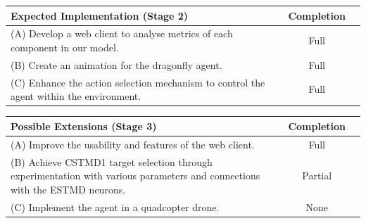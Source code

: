 \documentclass[a4paper,11pt]{article}
\begin{document}
\begin{center}
    \begin{tabular}{p{12cm} c c}
    \textbf{Expected Implementation (Stage 2)} & \textbf{Completion} \\ \hline
	(A) Develop a web client to analyse metrics of each component in our model. & Full \\
	(B) Create an animation for the dragonfly agent. & Full\\
	(C) Enhance the action selection mechanism to control the agent within the environment. & Full\\
    \end{tabular}
\end{center}

\begin{center}
    \begin{tabular}{p{12cm} c c}
    \textbf{Possible Extensions (Stage 3)} & \textbf{Completion} \\ \hline
	(A) Improve the usability and features of the web client. & Full\\
	(B) Achieve CSTMD1 target selection through experimentation with various parameters and connections with the ESTMD neurons. & Partial\\
	(C) Implement the agent in a quadcopter drone. & None\\
    \end{tabular}
\end{center}
\end{document}
